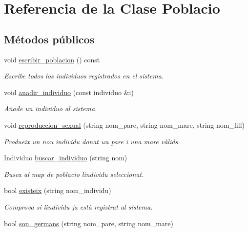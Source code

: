 \hypertarget{class_poblacio}{}\section{Referencia de la Clase Poblacio}
\label{class_poblacio}
\subsection*{Métodos públicos}
\begin{DoxyCompactItemize}
\item 
void \hyperlink{class_poblacio_ac27c16bc83806f37ced94a4ca16dcde3}{escribir\+\_\+poblacion} () const 
\begin{DoxyCompactList}\small\item\em Escribe todos los individuos registrados en el sistema. \end{DoxyCompactList}\item 
void \hyperlink{class_poblacio_a4f0ee787d73f542b695bdb7640b0c19f}{anadir\+\_\+individuo} (const individuo \&i)
\begin{DoxyCompactList}\small\item\em Añade un individuo al sistema. \end{DoxyCompactList}\item 
void \hyperlink{class_poblacio_a2967d103f843c3566fb2a7e4f97e0552}{reproduccion\+\_\+sexual} (string nom\+\_\+pare, string nom\+\_\+mare, string nom\+\_\+fill)
\begin{DoxyCompactList}\small\item\em Produeix un nou individu donat un pare i una mare vàlids. \end{DoxyCompactList}\item 
Individuo \hyperlink{class_poblacio_a82e917e29d78fda03e1f94cc5deb028b}{buscar\+\_\+individuo} (string nom)
\begin{DoxyCompactList}\small\item\em Busca al map de poblacio l\textquotesingle{}individu seleccionat. \end{DoxyCompactList}\item 
bool \hyperlink{class_poblacio_ae9b6311a7f75edca20d9bdeaf82f2e5c}{existeix} (string nom\+\_\+individu)
\begin{DoxyCompactList}\small\item\em Comprova si l\textquotesingle{}individu ja està registrat al sistema. \end{DoxyCompactList}\item 
bool \hyperlink{class_poblacio_a56949cb9cd49b9e8b4a34046b232b2e6}{son\+\_\+germans} (string nom\+\_\+pare, string nom\+\_\+mare)

\end{DoxyCompactItemize}
